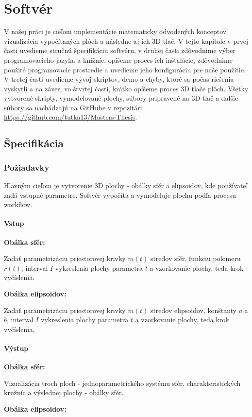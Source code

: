 \chapter{Softvér}
V našej práci je cieľom implementácie matematicky odvodených konceptov vizualizácia vypočítaných plôch a následne aj ich 3D tlač. V tejto kapitole v prvej časti uvedieme stručnú špecifikáciu softvéru, v druhej časti zdôvodnime výber programovacieho jazyka a knižníc, opíšeme proces ich inštalácie, zdôvodnime použité programovacie prostredie a uvedieme jeho konfiguráciu pre naše použitie. V tretej časti uvedieme vývoj skriptov, demo a chyby, ktoré sa počas riešenia vyskytli a na záver, vo štvrtej časti, krátko opíšeme proces 3D tlače plôch. Všetky vytvorené skripty, vymodelované plochy, súbory pripravené na 3D tlač a ďalšie súbory sa nachádzajú na GitHube v repozitári \url{https://github.com/tutka13/Masters-Thesis}.
\section{Špecifikácia}
\subsection{Požiadavky}
Hlavným cieľom je vytvorenie 3D plochy - obálky sfér a elipsoidov, kde používateľ zadá vstupné parametre. Softvér vypočíta a vymodeluje plochu podľa procesu workflow.
\subsubsection{Vstup}
\textbf{Obálka sfér:}

Zadať parametrizáciu priestorovej krivky $m(t)$ stredov sfér, funkciu polomeru $r(t)$, interval $I$ vykreslenia plochy parametra $t$ a vzorkovanie plochy, teda krok vyčíslenia.

\noindent \textbf{Obálka elipsoidov:}

Zadať parametrizáciu priestorovej krivky $m(t)$ stredov elipsoidov, konštanty $a$ a $b$, interval $I$ vykreslenia plochy parametra $t$ a vzorkovanie plochy, teda krok vyčíslenia.
\subsubsection{Výstup} 
\textbf{Obálka sfér:}

Vizualizácia troch ploch - jednoparametrického systému sfér, charakteristických kružníc a výslednej plochy - obálky sfér.

\noindent \textbf{Obálka elipsoidov:}

